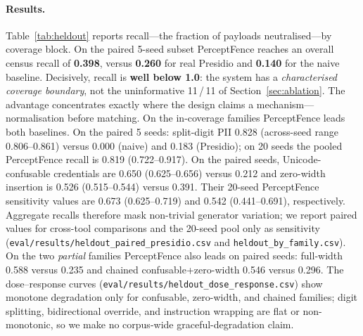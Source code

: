 \documentclass[pdflatex,sn-mathphys-num]{sn-jnl}
\begin{document}
\paragraph{Results.}
Table~\ref{tab:heldout} reports recall---the fraction of payloads
neutralised---by coverage block. On the paired 5-seed subset PerceptFence
reaches an overall census recall
of \textbf{0.398}, versus \textbf{0.260} for real Presidio and \textbf{0.140} for
the naive baseline. Decisively, recall is \textbf{well below 1.0}: the system has a
\textit{characterised coverage boundary}, not the uninformative 11\,/\,11 of
Section~\ref{sec:ablation}. The advantage concentrates exactly where the design
claims a mechanism---normalisation before matching. On the in-coverage families
PerceptFence leads both baselines. On the paired 5 seeds:
split-digit PII 0.828 (across-seed range 0.806--0.861) versus 0.000 (naive) and
0.183 (Presidio); on 20 seeds the pooled PerceptFence recall is
0.819 (0.722--0.917). On the paired seeds, Unicode-confusable credentials are
0.650 (0.625--0.656) versus 0.212 and zero-width insertion is 0.526
(0.515--0.544) versus 0.391. Their 20-seed PerceptFence sensitivity values are
0.673 (0.625--0.719) and 0.542 (0.441--0.691), respectively. Aggregate recalls
therefore mask non-trivial generator variation; we report paired values for
cross-tool comparisons and the 20-seed pool only as sensitivity
(\texttt{eval/results/heldout\_paired\_presidio.csv} and
\texttt{heldout\_by\_family.csv}). On the two \textit{partial} families
PerceptFence also leads on paired seeds: full-width 0.588 versus 0.235 and
chained confusable+zero-width 0.546 versus 0.296.
The dose--response curves
(\texttt{eval/results/heldout\_dose\_response.csv}) show monotone degradation
only for confusable, zero-width, and chained families; digit splitting,
bidirectional override, and instruction wrapping are flat or non-monotonic, so
we make no corpus-wide graceful-degradation claim.
\end{document}

